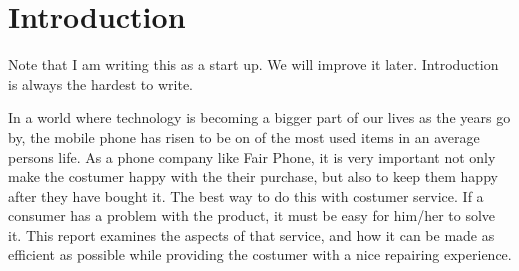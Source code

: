 \documentclass[final]{scrreprt} %
\begin{document}
\chapter{Introduction}
Note that I am writing this as a start up. We will improve it later. Introduction is always the hardest to write.

In a world where technology is becoming a bigger part of our lives as the years go by, the mobile phone has risen to be on of the most used items in an average persons life. As a phone company like Fair Phone, it is very important not only make the costumer happy with the their purchase, but also to keep them happy after they have bought it. The best way to do this with costumer service. If a consumer has a problem with the product, it must be easy for him/her to solve it. This report examines the aspects of that service, and how it can be made as efficient as possible while providing the costumer with a nice repairing experience.
\end{document}
